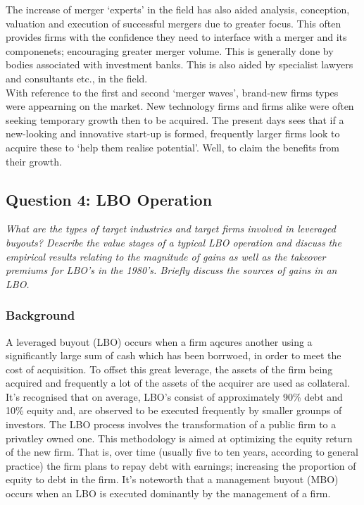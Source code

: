 \documentclass[11pt, english]{article}
\begin{document}
        The increase of merger `experts' in the field has also aided analysis, conception, valuation and execution of successful mergers due to greater focus. This often provides firms with the confidence they need to interface with a merger and its componenets; encouraging greater merger volume. This is generally done by bodies associated with investment banks. This is also aided by specialist lawyers and consultants etc., in the field.\\

        With reference to the first and second `merger waves', brand-new firms types were appearning on the market. New technology firms and firms alike were often seeking temporary growth then to be acquired. The present days sees that if a new-looking and innovative start-up is formed, frequently larger firms look to acquire these to `help them realise potential'. Well, to claim the benefits from their growth.

	\newpage

	\subsection{Question 4: LBO Operation}

	\textit{What are the types of target industries and target firms involved in leveraged buyouts? Describe the value stages of a typical LBO operation and discuss the empirical results relating to the magnitude of gains as well as the takeover premiums for LBO’s in the 1980’s. Briefly discuss the sources of gains in an LBO.}\\

		\subsubsection*{Background}

	A leveraged buyout (LBO) occurs when a firm aqcures another using a significantly large sum of cash which has been borrwoed, in order to meet the cost of acquisition. To offset this great leverage, the assets of the firm being acquired and frequently a lot of the assets of the acquirer are used as collateral. It's recognised that on average, LBO's consist of approximately 90\% debt and 10\% equity and, are observed to be executed frequently by smaller grounps of investors. The LBO process involves the transformation of a public firm to a privatley owned one. This methodology is aimed at optimizing the equity return of the new firm. That is, over time (usually five to ten years, according to general practice) the firm plans to repay debt with earnings; increasing the proportion of equity to debt in the firm. It's noteworth that a management buyout (MBO) occurs when an LBO is executed dominantly by the management of a firm.\\
\end{document}
